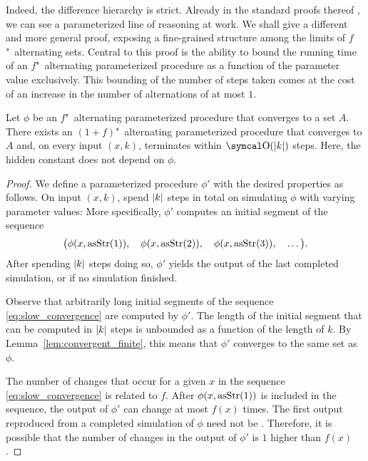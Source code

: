 Indeed, the difference hierarchy is strict.
Already in the standard proofs thereof \parencite{arslanov1997degree,ershov1968hierarchyi,putnam1965trial}, we can see a parameterized line of reasoning at work.
We shall give a different and more general proof, exposing a fine-grained structure among the limits of $f$"~alternating sets.
Central to this proof is the ability to bound the running time of an $f$"~alternating parameterized procedure as a function of the parameter value exclusively.
This bounding of the number of steps taken comes at the cost of an increase in the number of alternations of at most $1$.
\begin{theorem}
\label{thm:slow_convergence}%
  Let $\phi$ be an $f$"~alternating parameterized procedure that converges to a set $A$.
  There exists an $(1 + f)$"~alternating parameterized procedure that converges to $A$ and, on every input $(x, k)$, terminates within $\bigO(\length{k})$ steps.
  Here, the hidden constant does not depend on $\phi$.
\end{theorem}
\begin{proof}
  We define a parameterized procedure $\phi'$ with the desired properties as follows.
  On input $(x, k)$, spend ${\lvert k\rvert}$ steps in total on simulating $\phi$ with varying parameter values:
  More specifically, $\phi'$ computes an initial segment of the sequence
  \begin{equation}
  \label{eq:slow_convergence}
    \big(\phi(x, \operatorname{asStr}(1)),\quad \phi(x, \operatorname{asStr}(2)),\quad \phi(x, \operatorname{asStr}(3)), \quad \ldots\big).
  \end{equation}
  After spending ${\lvert k\rvert}$ steps doing so, $\phi'$ yields the output of the last completed simulation, or  if no simulation finished.

  Observe that arbitrarily long initial segments of the sequence \eqref{eq:slow_convergence} are computed by $\phi'$.
  The length of the initial segment that can be computed in ${\lvert k\rvert}$ steps is unbounded as a function of the length of $k$.
  By Lemma~\ref{lem:convergent_finite}, this means that $\phi'$ converges to the same set as $\phi$.

  The number of changes that occur for a given $x$ in the sequence \eqref{eq:slow_convergence} is related to $f$.
  After $\phi(x, \operatorname{asStr}(1))$ is included in the sequence, the output of $\phi'$ can change at most $f(x)$ times.
  The first output reproduced from a completed simulation of $\phi$ need not be .
  Therefore, it is possible that the number of changes in the output of $\phi'$ is $1$ higher than $f(x)$.
\end{proof}

